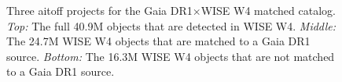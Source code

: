 \documentclass[11pt,a4paper]{article}
\begin{document}
\begin{figure}
\begin{center}
    \caption[Lorem ipsum dolor sit amet, consectetur adipiscing elit. Aliquam porta sodales est, vel cursus risus porta non.]
    {Three aitoff projects for the Gaia DR1$\times$WISE W4 matched catalog.
    {\it Top:} The full 40.9M objects that are detected in WISE W4. 
    {\it Middle:}  The 24.7M WISE W4 objects that are matched to a Gaia DR1 source. 
    {\it Bottom:}  The 16.3M WISE W4 objects that are not matched to a Gaia DR1 source. 
  }
    \label{fig:fig5}
\end{center}
\end{figure}








\end{document}
